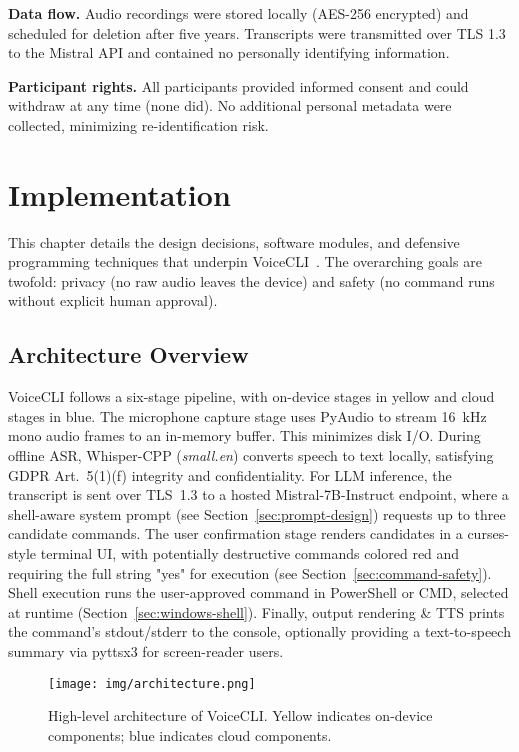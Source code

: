 \documentclass[a4paper,12pt]{article}
\begin{document}
\textbf{Data flow.} Audio recordings were stored locally (AES-256 encrypted) and scheduled for deletion after five years. Transcripts were transmitted over TLS 1.3 to the Mistral API and contained no personally identifying information.

\textbf{Participant rights.} All participants provided informed consent and could withdraw at any time (none did). No additional personal metadata were collected, minimizing re-identification risk.

\newpage

\section{Implementation}
\noindent This chapter details the design decisions, software modules, and defensive programming techniques that underpin VoiceCLI~\cite{ref25}. The overarching goals are twofold: privacy (no raw audio leaves the device) and safety (no command runs without explicit human approval).

\subsection{Architecture Overview}
\noindent VoiceCLI follows a six-stage pipeline, with on-device stages in yellow and cloud stages in blue. The microphone capture stage uses PyAudio to stream 16~kHz mono audio frames to an in-memory buffer. This minimizes disk I/O. During offline ASR, Whisper-CPP (\textit{small.en}) converts speech to text locally, satisfying GDPR Art.~5(1)(f) integrity and confidentiality. For LLM inference, the transcript is sent over TLS~1.3 to a hosted Mistral-7B-Instruct endpoint, where a shell-aware system prompt (see Section~\ref{sec:prompt-design}) requests up to three candidate commands. The user confirmation stage renders candidates in a curses-style terminal UI, with potentially destructive commands colored red and requiring the full string "yes" for execution (see Section~\ref{sec:command-safety}). Shell execution runs the user-approved command in PowerShell or CMD, selected at runtime (Section~\ref{sec:windows-shell}). Finally, output rendering \& TTS prints the command's stdout/stderr to the console, optionally providing a text-to-speech summary via pyttsx3 for screen-reader users.

\begin{figure}[H]
\centering
\texttt{[image: img/architecture.png]}
\caption{High-level architecture of VoiceCLI. Yellow indicates on-device components; blue indicates cloud components.}
\label{fig:architecture}
\end{figure}
\end{document}
